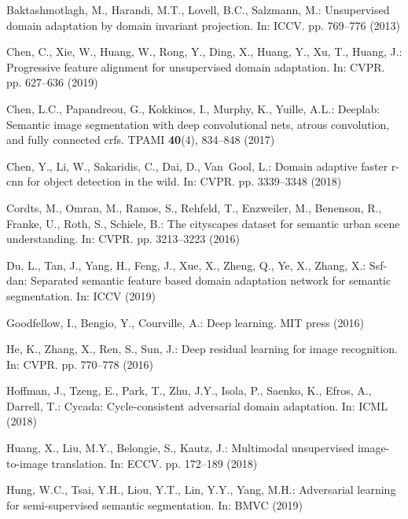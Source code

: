 \documentclass[runningheads]{llncs}
\begin{document}
\clearpage
\begin{thebibliography}{10}
\providecommand{\url}[1]{\texttt{#1}}
\providecommand{\urlprefix}{URL }
\providecommand{\doi}[1]{https://doi.org/#1}

Baktashmotlagh, M., Harandi, M.T., Lovell, B.C., Salzmann, M.: Unsupervised
  domain adaptation by domain invariant projection. In: ICCV. pp. 769--776
  (2013)

Chen, C., Xie, W., Huang, W., Rong, Y., Ding, X., Huang, Y., Xu, T., Huang, J.:
  Progressive feature alignment for unsupervised domain adaptation. In: CVPR.
  pp. 627--636 (2019)

Chen, L.C., Papandreou, G., Kokkinos, I., Murphy, K., Yuille, A.L.: Deeplab:
  Semantic image segmentation with deep convolutional nets, atrous convolution,
  and fully connected crfs. TPAMI  \textbf{40}(4),  834--848 (2017)

Chen, Y., Li, W., Sakaridis, C., Dai, D., Van~Gool, L.: Domain adaptive faster
  r-cnn for object detection in the wild. In: CVPR. pp. 3339--3348 (2018)

Cordts, M., Omran, M., Ramos, S., Rehfeld, T., Enzweiler, M., Benenson, R.,
  Franke, U., Roth, S., Schiele, B.: The cityscapes dataset for semantic urban
  scene understanding. In: CVPR. pp. 3213--3223 (2016)

Du, L., Tan, J., Yang, H., Feng, J., Xue, X., Zheng, Q., Ye, X., Zhang, X.:
  Ssf-dan: Separated semantic feature based domain adaptation network for
  semantic segmentation. In: ICCV (2019)

Goodfellow, I., Bengio, Y., Courville, A.: Deep learning. MIT press (2016)

He, K., Zhang, X., Ren, S., Sun, J.: Deep residual learning for image
  recognition. In: CVPR. pp. 770--778 (2016)

Hoffman, J., Tzeng, E., Park, T., Zhu, J.Y., Isola, P., Saenko, K., Efros, A.,
  Darrell, T.: Cycada: Cycle-consistent adversarial domain adaptation. In: ICML
  (2018)

Huang, X., Liu, M.Y., Belongie, S., Kautz, J.: Multimodal unsupervised
  image-to-image translation. In: ECCV. pp. 172--189 (2018)

Hung, W.C., Tsai, Y.H., Liou, Y.T., Lin, Y.Y., Yang, M.H.: Adversarial learning
  for semi-supervised semantic segmentation. In: BMVC (2019)


\end{thebibliography}
\end{document}
